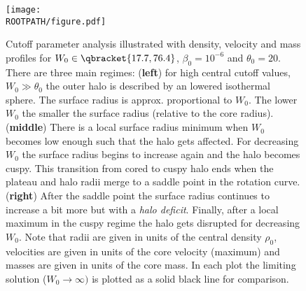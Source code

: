 \begin{figure}%
	\centering%
	\texttt{[image: \\ROOTPATH/figure.pdf]}
	\caption{Cutoff parameter analysis illustrated with density, velocity and mass profiles for $W_0\in\qbracket{17.7,76.4}$, $\beta_0 = 10^{-6}$ and $\theta_0 = 20$. There are three main regimes: (\textbf{left}) for high central cutoff values, $W_0 \gg \theta_0$ the outer halo is described by an lowered isothermal sphere. The surface radius is approx. proportional to $W_0$. The lower $W_0$ the smaller the surface radius (relative to the core radius). (\textbf{middle}) There is a local surface radius minimum when $W_0$ becomes low enough such that the halo gets affected. For decreasing $W_0$ the surface radius begins to increase again and the halo becomes cuspy. This transition from cored to cuspy halo ends when the plateau and halo radii merge to a saddle point in the rotation curve. (\textbf{right}) After the saddle point the surface radius continues to increase a bit more but with a \textit{halo deficit}. Finally, after a local maximum in the cuspy regime the halo gets disrupted for decreasing $W_0$. Note that radii are given in units of the central density $\rho_0$, velocities are given in units of the core velocity (maximum) and masses are given in units of the core mass. In each plot the limiting solution ($W_0 \to \infty)$ is plotted as a solid black line for comparison.}%
	\label{fig:profile:with-cutoff:W0:core}%
\end{figure}